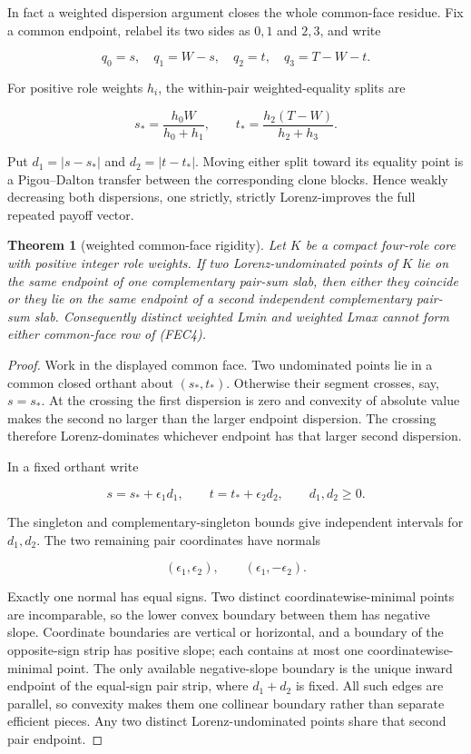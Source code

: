 \documentclass[11pt]{article}
\newtheorem{theorem}{Theorem}
\begin{document}
In fact a weighted dispersion argument closes the whole common-face residue.
Fix a common endpoint, relabel its two sides as ${0,1}$ and ${2,3}$,
and write

\[
 q_0=s,\quad q_1=W-s,\quad q_2=t,\quad q_3=T-W-t.       \tag{FEC5}
\]

For positive role weights $h_i$, the within-pair weighted-equality splits are

\[
 s_*=\frac{h_0W}{h_0+h_1},\qquad
 t_*=\frac{h_2(T-W)}{h_2+h_3}.                           \tag{FEC6}
\]

Put $d_1=|s-s_*|$ and $d_2=|t-t_*|$.  Moving either split toward its
equality point is a Pigou--Dalton transfer between the corresponding clone
blocks.  Hence weakly decreasing both dispersions, one strictly, strictly
Lorenz-improves the full repeated payoff vector.

\begin{theorem}[weighted common-face rigidity]\label{thm:common-face-rigidity}
Let $K$ be a compact four-role core with positive integer role weights.  If two
Lorenz-undominated points of $K$ lie on the same endpoint of one
complementary pair-sum slab, then either they coincide or they lie on the
same endpoint of a second independent complementary pair-sum slab.
Consequently distinct weighted Lmin and weighted Lmax cannot form either
common-face row of (FEC4).
\end{theorem}

\begin{proof}
Work in the displayed common face.  Two undominated points lie in a common
closed orthant about $(s_*,t_*)$.  Otherwise their segment crosses, say,
$s=s_*$.  At the crossing the first dispersion is zero and convexity of
absolute value makes the second no larger than the larger endpoint
dispersion.  The crossing therefore Lorenz-dominates whichever endpoint has
that larger second dispersion.

In a fixed orthant write

\[
 s=s_*+\epsilon_1d_1,\qquad t=t_*+\epsilon_2d_2,
 \qquad d_1,d_2\ge0.                                    \tag{FEC7}
\]

The singleton and complementary-singleton bounds give independent intervals
for $d_1,d_2$.  The two remaining pair coordinates have normals

\[
 (\epsilon_1,\epsilon_2),\qquad
 (\epsilon_1,-\epsilon_2).                              \tag{FEC8}
\]

Exactly one normal has equal signs.  Two distinct coordinatewise-minimal
points are incomparable, so the lower convex boundary between them has
negative slope.  Coordinate boundaries are vertical or horizontal, and a
boundary of the opposite-sign strip has positive slope; each contains at
most one coordinatewise-minimal point.  The only available negative-slope
boundary is the unique inward endpoint of the equal-sign pair strip, where
$d_1+d_2$ is fixed.  All such edges are parallel, so convexity makes them one
collinear boundary rather than separate efficient pieces.  Any two distinct
Lorenz-undominated points share that second pair endpoint.
\end{proof}
\end{document}
